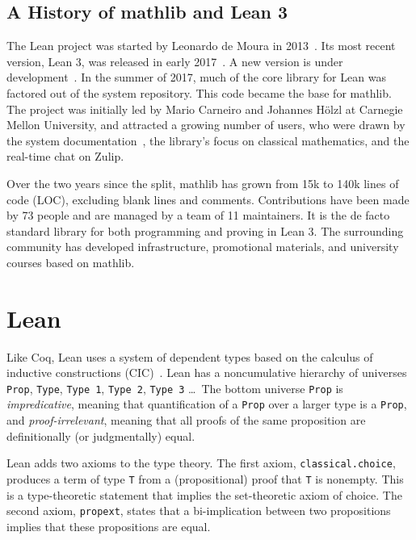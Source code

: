\documentclass[sigplan]{acmart}\settopmatter{}
\newcommand{\mathlib}{\textsf{mathlib}\xspace}
\newcommand{\numcontrib}{73\xspace}
\begin{document}
\subsection{A History of \mathlib and Lean 3}
\label{subsection:intro:history}

The Lean project was started by Leonardo de Moura in 2013~\cite{Mour15a}.
Its most recent version, Lean 3, was released in early 2017~\cite{EURAM17}.
A new version is under development~\cite{Ullr19}.
In the summer of 2017, much of the core library for Lean was factored out of the system repository.
This code became the base for \mathlib.
The project was initially led by Mario Carneiro and Johannes H\"olzl at Carnegie Mellon University,
and attracted a growing number of users,
who were drawn by the system documentation~\cite{Avig14}, the library's focus on classical mathematics, and the real-time chat on Zulip.

Over the two years since the split, \mathlib has grown from 15k to 140k lines of code (LOC), excluding blank lines and comments. %
Contributions have been made by \numcontrib people and are managed by a team of 11 maintainers.
It is the de facto standard library for both programming and proving in Lean 3.
The surrounding community has developed infrastructure, promotional materials, and university courses based on \mathlib.




\section{Lean}
\label{section:lean}

Like Coq, Lean uses a system of dependent types based on the calculus of inductive constructions (CIC)~\cite{Pfen89}.
Lean has a noncumulative hierarchy of universes
\lstinline{Prop}, \lstinline{Type}, \lstinline{Type 1}, \lstinline{Type 2}, \lstinline{Type 3} \ldots\,
The bottom universe \lstinline{Prop} is \emph{impredicative}, meaning that quantification of a \lstinline{Prop} over a larger type is a \lstinline{Prop}, and \emph{proof-irrelevant}, meaning that all proofs of the same proposition are definitionally (or judgmentally) equal.

Lean adds two axioms to the type theory.
The first axiom, \lstinline{classical.choice}, produces a term of type \lstinline{T} from a (propositional) proof that \lstinline{T} is nonempty.
This is a type-theoretic statement that implies the set-theoretic axiom of choice.
The second axiom, \lstinline{propext}, states that a bi-implication between two propositions implies that these propositions are equal.
\end{document}
